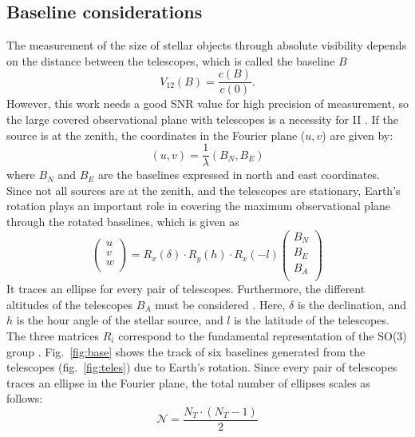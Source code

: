 \subsection{Baseline considerations}
The measurement of the size of stellar objects through absolute visibility depends on the distance between the telescopes, which is called the baseline $B$
\begin{equation}
	V_{12}(B) = \frac{c(B)}{c(0)}.
	\label{eq:angular_size_meas}
\end{equation}
However, this work needs a good SNR value for high precision of measurement, so the large covered observational plane with telescopes is a necessity for II \citep{acciari2020optical, abeysekara2020demonstration}. If the source is at the zenith, the coordinates in the Fourier plane ($u,v$) are given by:
\begin{equation}
	(u,v) = \frac{1}{\lambda} (B_N, B_E)
\end{equation}
where $B_N$ and $B_E$ are the baselines expressed in north and east coordinates. Since not all sources are at the zenith, and the telescopes are stationary, Earth's rotation plays an important role in covering the maximum observational plane through the rotated baselines, which is given as  
\begin{equation}
	\begin{pmatrix} u\\ v\\ w\\ \end{pmatrix} = R_x(\delta) \cdot R_y(h) \cdot R_x(-l) \begin{pmatrix} B_N\\ B_E\\ B_A\\ \end{pmatrix}
	\label{eq:baseline_rot}
\end{equation}
It traces an ellipse for every pair of telescopes. Furthermore, the different altitudes of the telescopes $B_A$ must be considered \citep{dravins2013optical, saha2020theory}. Here, $\delta$ is the declination, and $h$ is the hour angle of the stellar source, and $l$ is the latitude of the telescopes. The three matrices $R_i$ correspond to the fundamental representation of the SO(3) group \citep{saha2020theory}. Fig.~\ref{fig:base} shows the track of six baselines generated from the telescopes (fig.~\ref{fig:teles}) due to Earth's rotation. Since every pair of telescopes traces an ellipse in the Fourier plane, the total number of ellipses scales as follows:
\begin{equation}
	\label{eq:N_telescopes}
	\mathcal{N} = \frac{N_T \cdot (N_T -1)}{2}
\end{equation}

